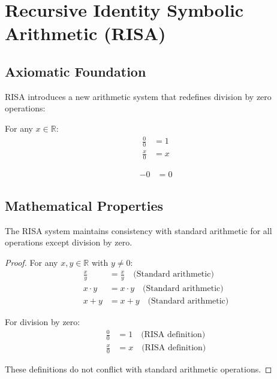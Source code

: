 \documentclass[12pt,a4paper]{article}
\begin{document}
\section{Recursive Identity Symbolic Arithmetic (RISA)}

\subsection{Axiomatic Foundation}

RISA introduces a new arithmetic system that redefines division by zero operations:

\begin{axiom}
For any $x \in \mathbb{R}$:
\begin{align}
\frac{0}{0} &= 1 \\
\frac{x}{0} &= x
\end{align}
\end{axiom}

\begin{axiom}
\begin{align}
-0 &= 0
\end{align}
\end{axiom}

\subsection{Mathematical Properties}

\begin{theorem}
The RISA system maintains consistency with standard arithmetic for all operations except division by zero.
\end{theorem}

\begin{proof}
For any $x, y \in \mathbb{R}$ with $y \neq 0$:
\begin{align}
\frac{x}{y} &= \frac{x}{y} \quad \text{(Standard arithmetic)} \\
x \cdot y &= x \cdot y \quad \text{(Standard arithmetic)} \\
x + y &= x + y \quad \text{(Standard arithmetic)}
\end{align}

For division by zero:
\begin{align}
\frac{0}{0} &= 1 \quad \text{(RISA definition)} \\
\frac{x}{0} &= x \quad \text{(RISA definition)}
\end{align}

These definitions do not conflict with standard arithmetic operations.
\end{proof}
\end{document}
